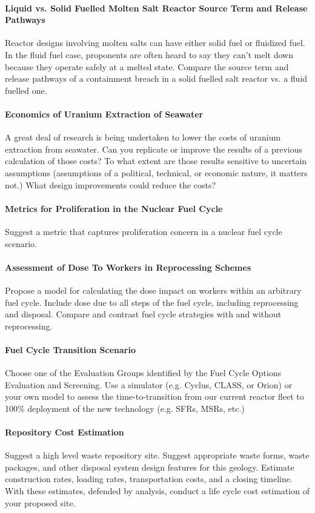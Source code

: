 \documentclass[12pts, answers]{exam}
\begin{document}
\paragraph{Liquid vs. Solid Fuelled Molten Salt Reactor Source Term and Release
Pathways} Reactor designs involving molten salts can have either solid fuel or
fluidized fuel. In the fluid fuel case, proponents are often heard to say they
can't melt down because they operate safely at a melted state. Compare the
source term and release pathways of a containment breach in a solid fuelled
salt reactor vs. a fluid fuelled one.

\paragraph{Economics of Uranium Extraction of Seawater} A great deal of
research is being undertaken to lower the costs of uranium extraction from
seawater. Can you replicate or improve the results of a previous calculation of those
costs? To what extent are those results sensitive to uncertain assumptions
(assumptions of a political, technical, or economic nature, it matters not.) 
What design improvements could reduce the costs?

\paragraph{Metrics for Proliferation in the Nuclear Fuel Cycle} Suggest a
metric that captures proliferation concern in a nuclear fuel cycle scenario.

\paragraph{Assessment of Dose To Workers in Reprocessing Schemes} Propose a model for
calculating the dose impact on workers within an arbitrary fuel cycle. Include
dose due to all steps of the fuel cycle, including reprocessing and disposal.
Compare and contrast fuel cycle strategies with and without reprocessing.

\paragraph{Fuel Cycle Transition Scenario} Choose one of the Evaluation Groups
identified by the Fuel Cycle Options Evaluation and Screening. Use a simulator
(e.g. Cyclus, CLASS, or Orion) or your own model to assess the
time-to-transition from our current reactor fleet to 100\% deployment of the
new technology (e.g. SFRs, MSRs, etc.)

\paragraph{Repository Cost Estimation} Suggest a high level waste repository
site. Suggest appropriate waste forms, waste packages, and other disposal
system design features for this geology. Estimate construction rates, loading
rates, transportation costs, and a closing timeline. With these estimates,
defended by analysis, conduct a life cycle cost estimation of your proposed
site.

\nocite{*}


\end{document}
